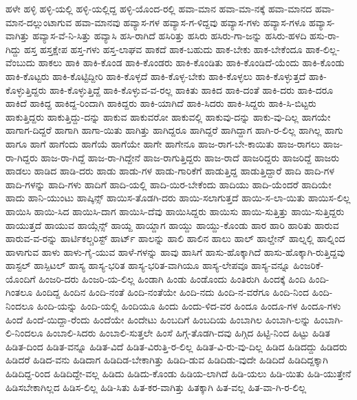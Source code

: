 {ಹಳೇ
ಹಳ್ಳಿ
ಹಳ್ಳಿ-ಯಲ್ಲಿ
ಹಳ್ಳಿ-ಯಲ್ಲಿದ್ದ
ಹಳ್ಳಿ-ಯೊಂದ-ರಲ್ಲಿ
ಹವಾ-ಮಾನ
ಹವಾ-ಮಾ-ನಕ್ಕೆ
ಹವಾ-ಮಾನದ
ಹವಾ-ಮಾನ-ದಲ್ಲುಂಟಾಗುವ
ಹವಾ-ಮಾನವು
ಹವ್ಯಾಸ-ಗಳ
ಹವ್ಯಾಸ-ಗ-ಳಿದ್ದವು
ಹವ್ಯಾಸ-ಗಳು
ಹವ್ಯಾಸ-ಗಳೂ
ಹವ್ಯಾಸ-ವಾಗಿತ್ತು
ಹವ್ಯಾಸ-ವೆ-ನಿ-ಸಿತ್ತು
ಹವ್ಯಾಸಿ
ಹಸಿ-ರಾಗಿದೆ
ಹಸಿರಿತ್ತು
ಹಸಿರು
ಹಸಿರು-ಗಾ-ಜನ್ನು
ಹಸಿರು-ಹಳದಿ
ಹಸು-ರಾ-ಗಿದ್ದು
ಹಸ್ತ
ಹಸ್ತಕ್ಷೇಪ
ಹಸ್ತ-ಗಳು
ಹಸ್ತ-ಲಾಘವ
ಹಾಕದೆ
ಹಾಕ-ಬಹುದು
ಹಾಕ-ಬೇಕು
ಹಾಕ-ಬೇಕೆಂದೂ
ಹಾಕ-ಲಿಲ್ಲ-ವೆಂಬುದು
ಹಾಕಲು
ಹಾಕಿ
ಹಾಕಿ-ಕೊಂಡ
ಹಾಕಿ-ಕೊಂಡರು
ಹಾಕಿ-ಕೊಂಡಿತು
ಹಾಕಿ-ಕೊಂಡಿದೆ-ಯೆಂದು
ಹಾಕಿ-ಕೊಂಡು
ಹಾಕಿ-ಕೊಟ್ಟರು
ಹಾಕಿ-ಕೊಟ್ಟಿದ್ದೀರಿ
ಹಾಕಿ-ಕೊಳ್ಳದೆ
ಹಾಕಿ-ಕೊಳ್ಳ-ಬೇಕು
ಹಾಕಿ-ಕೊಳ್ಳಲು
ಹಾಕಿ-ಕೊಳ್ಳುತ್ತದೆ
ಹಾಕಿ-ಕೊಳ್ಳುತ್ತಿದ್ದರು
ಹಾಕಿ-ಕೊಳ್ಳುತ್ತಿದ್ದೆ
ಹಾಕಿ-ಕೊಳ್ಳುವ-ವ-ರಲ್ಲ
ಹಾಕಿತು
ಹಾಕಿದ
ಹಾಕಿ-ದಂತೆ
ಹಾಕಿ-ದರು
ಹಾಕಿ-ದರೂ
ಹಾಕಿದೆ
ಹಾಕಿದ್ದ
ಹಾಕಿದ್ದ-ರಿಂದಾಗಿ
ಹಾಕಿದ್ದರು
ಹಾಕಿ-ಯಾಗಿದೆ
ಹಾಕಿ-ಸಿದರು
ಹಾಕಿ-ಸಿದ್ದರು
ಹಾಕಿ-ಸಿ-ಬಿಟ್ಟರು
ಹಾಕುತ್ತಿದ್ದರು
ಹಾಕುತ್ತಿದ್ದು-ದನ್ನು
ಹಾಕುವ
ಹಾಕುವರೋ
ಹಾಕುವಲ್ಲಿ
ಹಾಕುವು-ದನ್ನು
ಹಾಕು-ವು-ದಿಲ್ಲ
ಹಾಗಯೇ
ಹಾಗಾಗ-ದಿದ್ದರೆ
ಹಾಗಾಗಿ
ಹಾಗಾ-ಯಿತು
ಹಾಗಿತ್ತು
ಹಾಗಿದ್ದರೂ
ಹಾಗಿದ್ದರೆ
ಹಾಗಿದ್ದಾಗ
ಹಾಗಿ-ರ-ಲಿಲ್ಲ
ಹಾಗಿಲ್ಲ
ಹಾಗು
ಹಾಗೂ
ಹಾಗೆ
ಹಾಗೆಂದು
ಹಾಗೆಯೆ
ಹಾಗೆಯೇ
ಹಾಗೇ
ಹಾಗೇನೂ
ಹಾಜ-ರಾಗ-ಬೇ-ಕಾಯಿತು
ಹಾಜ-ರಾಗಲು
ಹಾಜ-ರಾ-ಗಿದ್ದರು
ಹಾಜ-ರಾ-ಗಿದ್ದೆ
ಹಾಜ-ರಾ-ಗಿದ್ದೇನೆ
ಹಾಜ-ರಾಗುತ್ತಿದ್ದರು
ಹಾಜ-ರಾದೆ
ಹಾಜರಿದ್ದರು
ಹಾಜರಿದ್ದೆ
ಹಾಜರು
ಹಾಡಲು
ಹಾಡಿದ
ಹಾಡಿ-ದರು
ಹಾಡು
ಹಾಡು-ಗಳ
ಹಾಡು-ಗಾರಿಕೆಗೆ
ಹಾಡುತ್ತಿದ್ದ
ಹಾಡುತ್ತಿದ್ದಾರೆ
ಹಾದಿ
ಹಾದಿ-ಗಳ
ಹಾದಿ-ಗಳನ್ನು
ಹಾದಿ-ಗಳು
ಹಾದಿಗೆ
ಹಾದಿ-ಯಲ್ಲಿ
ಹಾದಿ-ಯಿರ-ಬೇಕೆಂದು
ಹಾದಿಯು
ಹಾದಿ-ಯೆಂದರೆ
ಹಾದಿಯೇ
ಹಾದು
ಹಾನಿ-ಯುಂಟು
ಹಾಪ್ಕಿನ್ಸ್
ಹಾಯಿಸ-ತೊಡಗಿ-ದರು
ಹಾಯಿ-ಸಲಾಗುತ್ತದೆ
ಹಾಯಿ-ಸ-ಲಾ-ಯಿತು
ಹಾಯಿಸ-ಲಿಲ್ಲ
ಹಾಯಿಸಿ
ಹಾಯಿ-ಸಿದ
ಹಾಯಿಸಿ-ದಾಗ
ಹಾಯಿಸಿ-ದೆವು
ಹಾಯಿಸಿದ್ದರು
ಹಾಯಿಸು
ಹಾಯಿ-ಸುತ್ತಿತ್ತು
ಹಾಯಿ-ಸುತ್ತಿದ್ದರು
ಹಾಯುತ್ತದೆ
ಹಾಯುವ
ಹಾಯ್ಗೆನ್ಸ್
ಹಾಯ್ದ
ಹಾಯ್ದಾಗ
ಹಾಯ್ದು
ಹಾಯ್ದು-ಕೊಂಡು
ಹಾರ
ಹಾರಿ
ಹಾರಿತು
ಹಾರುವ
ಹಾರುವ-ವ-ರನ್ನು
ಹಾರ್ಟಿಕಲ್ಚರಿಸ್ಟ್
ಹಾರ್ಟ್
ಹಾಲನ್ನು
ಹಾಲಿ
ಹಾಲಿನ
ಹಾಲು
ಹಾಲ್
ಹಾಲ್ಡೇನ್
ಹಾಲ್ನಲ್ಲಿ
ಹಾಲ್ನಿಂದ
ಹಾಳಾಗುವ
ಹಾಳು
ಹಾಳು-ಗೈ-ಯುವ
ಹಾಳೆ-ಗಳನ್ನು
ಹಾವು
ಹಾಸಿಗೆ
ಹಾಸು-ಹೊಕ್ಕಾಗಿದೆ
ಹಾಸು-ಹೊಕ್ಕಾಗಿ-ರುತ್ತಿದ್ದವು
ಹಾಸ್ಟಲ್
ಹಾಸ್ಪಿಟಲ್
ಹಾಸ್ಯ
ಹಾಸ್ಯ-ಭರಿತ
ಹಾಸ್ಯ-ಭರಿತ-ವಾಗಿಯೂ
ಹಾಸ್ಯ-ಲೇಪವೂ
ಹಾಸ್ಯ-ವನ್ನೂ
ಹಿಂಜರಿಕೆ-ಯೊಂದಿಗೆ
ಹಿಂಜರಿ-ದರು
ಹಿಂಜರಿ-ಯ-ಲಿಲ್ಲ
ಹಿಂಡಾಗಿ
ಹಿಂಡು
ಹಿಂಡೊಂದು
ಹಿಂತಿರುಗಿ
ಹಿಂದಕ್ಕೆ
ಹಿಂದಿ
ಹಿಂದಿ-ಗಿಂತಲೂ
ಹಿಂದಿದ್ದ
ಹಿಂದಿನ
ಹಿಂದಿ-ನಂತೆ
ಹಿಂದಿ-ನಂತೆಯೇ
ಹಿಂದಿ-ನದು
ಹಿಂದಿ-ನ-ವರೆಗೂ
ಹಿಂದಿ-ನಿಂದ
ಹಿಂದಿ-ನಿಂದಲೂ
ಹಿಂದಿ-ಯನ್ನು
ಹಿಂದಿ-ಯಲ್ಲಿ
ಹಿಂದಿಯೂ
ಹಿಂದು
ಹಿಂದು-ಳಿದ-ವರ
ಹಿಂದೂ
ಹಿಂದೂ-ಗಳ
ಹಿಂದೂ-ಗಳು
ಹಿಂದೆ
ಹಿಂದೆ-ಯಿದ್ದಾ-ರೆಂದು
ಹಿಂದೆಯೇ
ಹಿಂದೇಟು
ಹಿಂಬದಿಗೆ
ಹಿಂಬದಿಯ
ಹಿಂಬಾಗಿಲ
ಹಿಂಬಾಗಿ-ಲನ್ನು
ಹಿಂಬಾಗಿ-ಲಿ-ನಿಂದಲೂ
ಹಿಂಬಾಲಿ-ಸಿದರು
ಹಿಂಬಾಲಿ-ಸುತ್ತಲೇ
ಹಿಂಸೆ
ಹಿಗ್ಗ-ತೊಡಗಿ-ದವು
ಹಿಗ್ಗಿದ
ಹಿಟ್ಟಿ-ನಿಂದ
ಹಿಟ್ಟು
ಹಿಡಿತ
ಹಿಡಿತ-ದಿಂದ
ಹಿಡಿತ-ವನ್ನೂ
ಹಿಡಿತ-ವಿದೆ
ಹಿಡಿತ-ವಿರುತ್ತಿ-ರ-ಲಿಲ್ಲ
ಹಿಡಿತ-ವಿ-ರು-ವು-ದಿಲ್ಲ
ಹಿಡಿದ
ಹಿಡಿದದ್ದು
ಹಿಡಿದರು
ಹಿಡಿದರೆ
ಹಿಡಿದ-ವನು
ಹಿಡಿದಾಗ
ಹಿಡಿದಿಡ-ಬೇಕಾಗಿತ್ತು
ಹಿಡಿದಿ-ಡುವ
ಹಿಡಿದಿಡು-ವುದೇ
ಹಿಡಿದಿದೆ
ಹಿಡಿದಿದ್ದಕ್ಕಾಗಿ
ಹಿಡಿದಿದ್ದ-ರಿಂದ
ಹಿಡಿದಿದ್ದೇ-ವಲ್ಲ
ಹಿಡಿದು
ಹಿಡಿದು-ಕೊಂಡು
ಹಿಡಿಯ-ಲಾಗಿದೆ
ಹಿಡಿ-ಯಲು
ಹಿಡಿ-ಯಿತು
ಹಿಡಿ-ಯುತ್ತೇನೆ
ಹಿಡಿಸಬೇಕಾಗಿಲ್ಲದ
ಹಿಡಿಸ-ಲಿಲ್ಲ
ಹಿಡಿ-ಸಿತು
ಹಿತ-ಕರ-ವಾಗಿತ್ತು
ಹಿತಕ್ಕಾಗಿ
ಹಿತ-ವಲ್ಲ
ಹಿತ-ವಾ-ಗಿ-ರ-ಲಿಲ್ಲ
}

